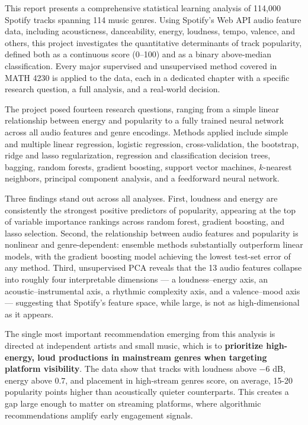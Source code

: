 \documentclass[12pt, oneside]{book}
\begin{document}
This report presents a comprehensive statistical learning analysis of 114{,}000 Spotify tracks spanning 114 music genres. Using Spotify's Web API audio feature data, including acousticness, danceability, energy, loudness, tempo, valence, and others, this project investigates the quantitative determinants of track popularity, defined both as a continuous score (0--100) and as a binary above-median classification. Every major supervised and unsupervised method covered in MATH 4230 is applied to the data, each in a dedicated chapter with a specific research question, a full analysis, and a real-world decision.

The project posed fourteen research questions, ranging from a simple linear relationship between energy and popularity to a fully trained neural network across all audio features and genre encodings. Methods applied include simple and multiple linear regression, logistic regression, cross-validation, the bootstrap, ridge and lasso regularization, regression and classification decision trees, bagging, random forests, gradient boosting, support vector machines, $k$-nearest neighbors, principal component analysis, and a feedforward neural network.

Three findings stand out across all analyses. First, loudness and energy are consistently the strongest positive predictors of popularity, appearing at the top of variable importance rankings across random forest, gradient boosting, and lasso selection. Second, the relationship between audio features and popularity is nonlinear and genre-dependent: ensemble methods substantially outperform linear models, with the gradient boosting model achieving the lowest test-set error of any method. Third, unsupervised PCA reveals that the 13 audio features collapse into roughly four interpretable dimensions --- a loudness--energy axis, an acoustic--instrumental axis, a rhythmic complexity axis, and a valence--mood axis --- suggesting that Spotify's feature space, while large, is not as high-dimensional as it appears.

The single most important recommendation emerging from this analysis is directed at independent artists and small music, which is to \textbf{prioritize high-energy, loud productions in mainstream genres when targeting platform visibility}. The data show that tracks with loudness above $-6$ dB, energy above 0.7, and placement in high-stream genres score, on average, 15-20 popularity points higher than acoustically quieter counterparts. This creates a gap large enough to matter on streaming platforms, where algorithmic recommendations amplify early engagement signals.
\end{document}
